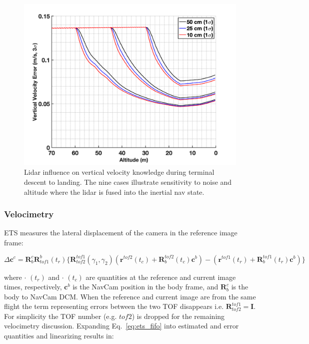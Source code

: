 \begin{figure}[htb]
	\centering\includegraphics[width=5in]{content/figures/nav_paper_terminal_velocity.png}
	\caption{Lidar influence on vertical velocity knowledge during terminal descent to landing. The nine cases illustrate sensitivity to noise and altitude where the lidar is fused into the inertial nav state.}
	\label{fig:vertical_velocity}
\end{figure}
\subsubsection{Velocimetry}

ETS measures the lateral displacement of the camera in the reference image frame:

\begin{equation} \label{eq:ets_fifo}
    \Delta \bm{c}^{c} = \bm{R}_{b}^{c}\bm{R}_{tof1}^{b}\left(t_{r}\right) \biggl\{\bm{R}_{tof2}^{tof1}\left(\gamma_{1}, \gamma_{2}\right)\left(\bm{r}^{tof2}\left(t_{c}\right) + \bm{R}_{b}^{tof2}\left(t_{c}\right)\bm{c}^{b}\right) - \left(\bm{r}^{tof1}\left(t_{r}\right) + \bm{R}_{b}^{tof1}\left(t_{r}\right)\bm{c}^{b}\right)\biggl\}
\end{equation}

\noindent where $\cdot$ $\left(t_{r}\right)$ and $\cdot$ $\left(t_{c}\right)$ are quantities at the reference and current image times, respectively, $\bm{c}^{b}$ is the \ac{NavCam} position in the body frame, and $\bm{R}_{b}^{c}$ is the body to \ac{NavCam} DCM. When the reference and current image are from the same flight the term representing errors between the two TOF disappears i.e. $\bm{R}_{tof2}^{tof1} = \bm{I}$. For simplicity the TOF number (e.g. $tof2$) is dropped for the remaining velocimetry discussion. Expanding Eq.~\ref{eq:ets_fifo} into estimated and error quantities and linearizing results in:

